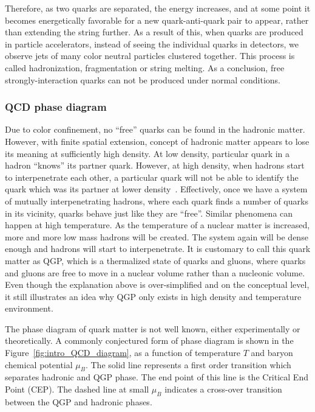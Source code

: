 Therefore, as two quarks are separated, the energy increases, and at some point it becomes energetically favorable for a new quark-anti-quark pair to appear, rather than extending the string further. As a result of this, when quarks are produced in particle accelerators, instead of seeing the individual quarks in detectors, we observe jets of many color neutral particles clustered together. This process is called hadronization, fragmentation or string melting. As a conclusion, free strongly-interaction quarks can not be produced under normal conditions.



\subsubsection{QCD phase diagram}

Due to color confinement, no ``free'' quarks can be found in the hadronic matter. However, with finite spatial extension, concept of hadronic matter appears to lose its meaning at sufficiently high density. At low density, particular quark in a hadron ``knows'' its partner quark. However, at high density, when hadrons start to interpenetrate each other, a particular quark will not be able to identify the quark which was its partner at lower density~\cite{Chaudhuri:2012yt}. Effectively, once we have a system of mutually interpenetrating hadrons, where each quark finds a number of quarks in its vicinity, quarks behave just like they are ``free''. Similar phenomena can happen at high temperature. As the temperature of a nuclear matter is increased, more and more low mass hadrons will be created. The system again will be dense enough and hadrons will start to interpenetrate. It is customary to call this quark matter as QGP, which is a thermalized state of quarks and gluons, where quarks and gluons are free to move in a nuclear volume rather than a nucleonic volume. Even though the explanation above is over-simplified and on the conceptual level, it still illustrates an idea why QGP only exists in high density and temperature environment.

The phase diagram of quark matter is not well known, either experimentally or theoretically. A commonly conjectured form of phase diagram is shown in the Figure~\ref{fig:intro_QCD_diagram}, as a function of temperature $T$ and baryon chemical potential $\mu_B$. The solid line represents a first order transition which separates hadronic and QGP phase. The end point of this line is the Critical End Point (CEP). The dashed line at small $\mu_B$ indicates a cross-over transition between the QGP and hadronic phases.

